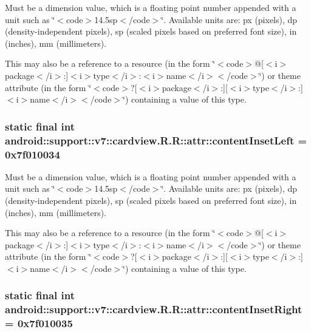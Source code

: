 Must be a dimension value, which is a floating point number appended with a unit such as \char`\"{}$<$code$>$14.5sp$<$/code$>$\char`\"{}. Available units are: px (pixels), dp (density-independent pixels), sp (scaled pixels based on preferred font size), in (inches), mm (millimeters). 

This may also be a reference to a resource (in the form \char`\"{}$<$code$>$@\mbox{[}$<$i$>$package$<$/i$>$:\mbox{]}$<$i$>$type$<$/i$>$:$<$i$>$name$<$/i$>$$<$/code$>$\char`\"{}) or theme attribute (in the form \char`\"{}$<$code$>$?\mbox{[}$<$i$>$package$<$/i$>$:\mbox{]}\mbox{[}$<$i$>$type$<$/i$>$:\mbox{]}$<$i$>$name$<$/i$>$$<$/code$>$\char`\"{}) containing a value of this type. \hypertarget{classandroid_1_1support_1_1v7_1_1cardview_1_1_r_1_1attr_ae57c05de2e8f6a0567e79055ae4d984}{
\subsubsection[{contentInsetLeft}]{\setlength{\rightskip}{0pt plus 5cm}static final int android::support::v7::cardview.R.R::attr::contentInsetLeft = 0x7f010034}}
\label{classandroid_1_1support_1_1v7_1_1cardview_1_1_r_1_1attr_ae57c05de2e8f6a0567e79055ae4d984}


Must be a dimension value, which is a floating point number appended with a unit such as \char`\"{}$<$code$>$14.5sp$<$/code$>$\char`\"{}. Available units are: px (pixels), dp (density-independent pixels), sp (scaled pixels based on preferred font size), in (inches), mm (millimeters). 

This may also be a reference to a resource (in the form \char`\"{}$<$code$>$@\mbox{[}$<$i$>$package$<$/i$>$:\mbox{]}$<$i$>$type$<$/i$>$:$<$i$>$name$<$/i$>$$<$/code$>$\char`\"{}) or theme attribute (in the form \char`\"{}$<$code$>$?\mbox{[}$<$i$>$package$<$/i$>$:\mbox{]}\mbox{[}$<$i$>$type$<$/i$>$:\mbox{]}$<$i$>$name$<$/i$>$$<$/code$>$\char`\"{}) containing a value of this type. \hypertarget{classandroid_1_1support_1_1v7_1_1cardview_1_1_r_1_1attr_a8f34cefc05c09cbdca29557807fb16e}{
\subsubsection[{contentInsetRight}]{\setlength{\rightskip}{0pt plus 5cm}static final int android::support::v7::cardview.R.R::attr::contentInsetRight = 0x7f010035}}
\label{classandroid_1_1support_1_1v7_1_1cardview_1_1_r_1_1attr_a8f34cefc05c09cbdca29557807fb16e}


